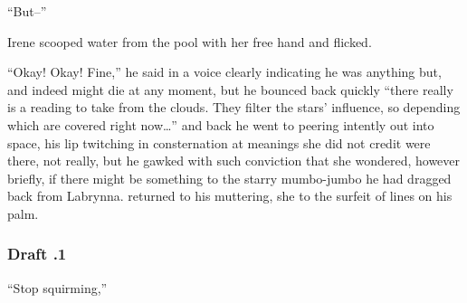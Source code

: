\documentclass[../FGP.tex]{subfiles}
\begin{document}
\begin{fragment}
``But--'' 

Irene scooped water from the pool with her free hand and flicked. 

``Okay! Okay! Fine,'' he said in a voice clearly indicating he was anything but, and indeed might die at any moment, but he bounced back quickly ``there really is a reading to take from the clouds. They filter the stars' influence, so depending which are covered right now\ldots'' and back he went to peering intently out into space, his lip twitching in consternation at meanings she did not credit were there, not really, but he gawked with such conviction that she wondered, however briefly, if there might be something to the starry mumbo-jumbo he had dragged back from Labrynna. 
 returned to his muttering, she to the surfeit of lines on his palm. 
\subsubsection{Draft \thefragment.1 }
 

 ``Stop squirming,'' 

\end{fragment}
\end{document}
